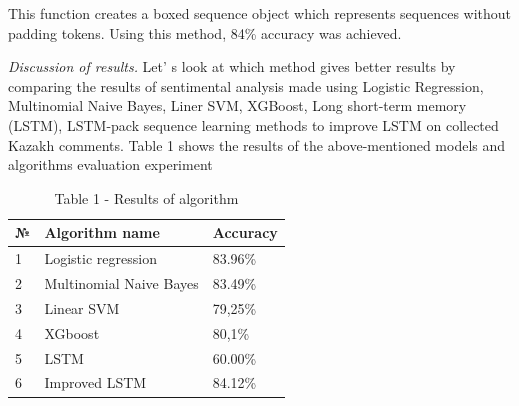 This function creates a boxed sequence object which represents sequences
without padding tokens. Using this method, 84\% accuracy was achieved.

\emph{Discussion of results.} Let' s look at which method
gives better results by comparing the results of sentimental analysis
made using Logistic Regression, Multinomial Naive Bayes, Liner SVM,
XGBoost, Long short-term memory (LSTM), LSTM-pack sequence learning
methods to improve LSTM on collected Kazakh comments. Table 1 shows the
results of the above-mentioned models and algorithms evaluation
experiment

\begin{table}[H]
\caption*{Table 1 - Results of algorithm}
\centering
\begin{tabular}{|l|l|l|}
\hline
№ & Algorithm name              & Accuracy \\ \hline
1 & Logistic regression         & 83.96\%  \\ \hline
2 & Multinomial Naive Bayes     & 83.49\%  \\ \hline
3 & Linear SVM                  & 79,25\%  \\ \hline
4 & XGboost                     & 80,1\%   \\ \hline
5 & LSTM                        & 60.00\%  \\ \hline
6 & Improved LSTM               & 84.12\%  \\ \hline
\end{tabular}
\end{table}


